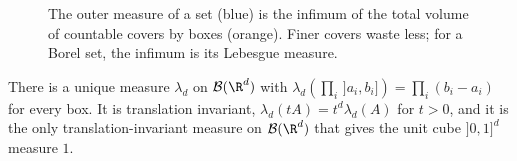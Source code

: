\begin{figure}[ht]
\centering
{}
\caption{The outer measure of a set (blue) is the infimum of the total volume of countable covers by boxes (orange). Finer covers waste less; for a
Borel set, the infimum is its Lebesgue measure.}
\label{fig:covering}
\end{figure}

\begin{theorem}\label{thm:lebesgue}
There is a unique measure $\lambda_d$ on $\mathcal B(\R^d)$ with $\lambda_d(\prod_i\,]a_i,b_i])=\prod_i(b_i-a_i)$ for every box. It is translation invariant, $\lambda_d(tA)=t^d\lambda_d(A)$ for $t>0$, and it
is the only translation-invariant measure on $\mathcal B(\R^d)$ that gives the unit cube $]0,1]^d$ measure $1$.
\end{theorem}
